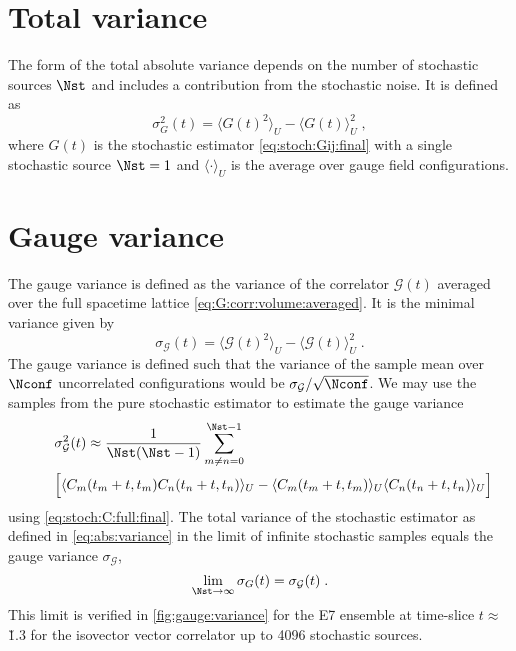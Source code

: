 \section{Total variance}
\label{sec:numerics:total:variance}

The form of the total absolute variance depends on the number of stochastic sources $\Nst$ and includes a contribution from the stochastic noise.
It is defined as
\begin{equation} \label{eq:abs:variance}
\sigma_{G}^{2}(t) = \langle G(t)^{2} \rangle_{U} - \langle G(t) \rangle_{U}^{2} \;,
\end{equation}
where $G(t)$ is the stochastic estimator \cref{eq:stoch:Gij:final} with a single stochastic source $\Nst=1$ and $\langle \cdot \rangle_U$ is the average over gauge field configurations.

\section{Gauge variance}
\label{sec:numerics:gauge:variance}

The gauge variance is defined as the variance of the correlator $\mathcal{G}(t)$ averaged over the full spacetime lattice \cref{eq:G:corr:volume:averaged}.
It is the minimal variance given by
\begin{equation} \label{eq:var:gauge}
\sigma_{\mathcal{G}}(t) = \langle \mathcal{G}(t)^{2} \rangle_{U} - \langle \mathcal{G}(t) \rangle_{U}^{2} \;.
\end{equation}
The gauge variance is defined such that the variance of the sample mean over $\Nconf$ uncorrelated configurations would be $\sigma_{\mathcal{G}}/\sqrt{\Nconf}$.
We may use the samples from the pure stochastic estimator to estimate the gauge variance
\begin{align}
\nonumber
&\sigma^{2}_{\mathcal{G}}(t) \approx
\frac{1}{\Nst(\Nst-1)} \sum_{m \neq n=0}^{\Nst-1}\\
\label{eq:appendix:gv:formula}
\qquad&\Big[ \langle C_m(t_m+t, t_m) C_n(t_n+t, t_n) \rangle_{U}
- \langle C_m(t_m+t,t_m) \rangle_{U} \langle C_n(t_n+t,t_n) \rangle_{U} \Big]
\end{align}
using \cref{eq:stoch:C:full:final}.
The total variance of the stochastic estimator as defined in \cref{eq:abs:variance} in the limit of infinite stochastic samples equals the gauge variance $\sigma_{\mathcal{G}}$,
\begin{equation} \label{eq:var:gauge:limit}
\lim_{\Nst \to \infty} \sigma_{G}(t) = \sigma_{\mathcal{G}}(t) \;.
\end{equation}
This limit is verified in \cref{fig:gauge:variance} for the E7 ensemble at time-slice $t \approx $ \u{1.3}{\femto \metre} for the isovector vector correlator up to \num{4096} stochastic sources.

